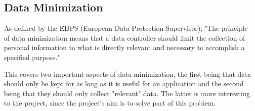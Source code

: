 
\subsection{Data Minimization}

As defined by the EDPS (European Data Protection Supervisor); "The principle of data minimization means that a data controller should limit the collection of personal information to what is directly relevant and necessary to accomplish a specified purpose." \cite{website:europa.eu}


This covers two important aspects of data minimization, the first being that data should only be kept for as long as it is useful for an application and the second being that they should only collect "relevant" data. The latter is more interesting to the project, since the project's aim is to solve part of this problem.


